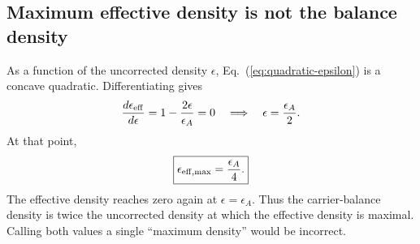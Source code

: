 \documentclass[11pt]{article}
\begin{document}
\subsection{Maximum effective density is not the balance density}
As a function of the uncorrected density $\epsilon$, Eq.~(\ref{eq:quadratic-epsilon}) is a concave quadratic. Differentiating gives
\begin{equation}
\frac{d\epsilon_{\rm eff}}{d\epsilon}=1-\frac{2\epsilon}{\epsilon_A}=0
\quad\Longrightarrow\quad \epsilon=\frac{\epsilon_A}{2}.
\end{equation}
At that point,
\begin{equation}
\boxed{\epsilon_{\rm eff,max}=\frac{\epsilon_A}{4}.}
\label{eq:max-effective}
\end{equation}
The effective density reaches zero again at $\epsilon=\epsilon_A$. Thus the carrier-balance density is twice the uncorrected density at which the effective density is maximal. Calling both values a single ``maximum density'' would be incorrect.
\end{document}
